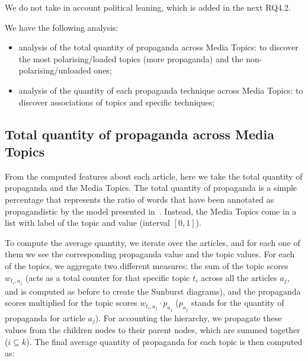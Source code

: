 We do not take in account political leaning, which is added in the next RQ4.2.

We have the following analysis:

\begin{itemize}
    \item analysis of the total quantity of propaganda across Media Topics: to discover the most polarising/loaded topics (more propaganda) and the non-polarising/unloaded ones;
    \item analysis of the quantity of each propaganda technique across Media Topics: to discover associations of topics and specific techniques;
\end{itemize}

\subsection{\statusgreen Total quantity of propaganda across Media Topics}
\label{ssec:topic_propaganda_tot}

From the computed features about each article, here we take the total quantity of propaganda and the Media Topics.
The total quantity of propaganda is a simple percentage that represents the ratio of words that have been annotated as propagandistic by the model presented in~\citet{da2019fine}.
Instead, the Media Topics come in a list with label of the topic and value (interval $[0,1]$).

To compute the average quantity, we iterate over the articles, and for each one of them we see the corresponding propaganda value and the topic values. For each of the topics, we aggregate two different measures: the sum of the topic scores $w_{t_{i},a_{j}}$ (acts as a total counter for that specific topic $t_{i}$ across all the articles $a_{j}$, and is computed as before to create the Sunburst diagrams), and the propaganda scores multiplied for the topic scores $w_{t_{i},a_{j}} \cdot p_{a_{j}}$ ($p_{a_{j}}$ stands for the quantity of propaganda for article $a_{j}$).
For accounting the hierarchy, we propagate these values from the children nodes to their parent nodes, which are summed together ($i\subseteq k$).
The final average quantity of propaganda for each topic is then computed as:

